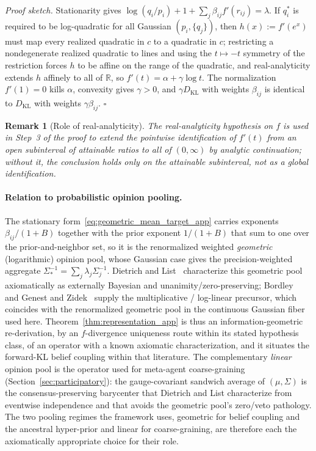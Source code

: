 \documentclass[11pt]{article}
\newtheorem{remark}{Remark}
\begin{document}
\emph{Proof sketch.} Stationarity gives $\log(q_i/p_i) + 1 + \sum_j \beta_{ij} f'(r_{ij}) = \lambda$. If $q_i^*$ is required to be log-quadratic for all Gaussian $(p_i, \{q_j\})$, then $h(x) := f'(e^x)$ must map every realized quadratic in $c$ to a quadratic in $c$; restricting a nondegenerate realized quadratic to lines and using the $t \mapsto -t$ symmetry of the restriction forces $h$ to be affine on the range of the quadratic, and real-analyticity extends $h$ affinely to all of $\mathbb{R}$, so $f'(t) = \alpha + \gamma\log t$. The normalization $f'(1) = 0$ kills $\alpha$, convexity gives $\gamma > 0$, and $\gamma D_{\mathrm{KL}}$ with weights $\beta_{ij}$ is identical to $D_{\mathrm{KL}}$ with weights $\gamma\beta_{ij}$. \hfill $\square$

\begin{remark}[Role of real-analyticity]
\label{rem:analyticity_role}
The real-analyticity hypothesis on $f$ is used in Step~3 of the proof to extend the pointwise identification of $f'(t)$ from an open subinterval of attainable ratios to all of $(0, \infty)$ by analytic continuation; without it, the conclusion holds only on the attainable subinterval, not as a global identification.
\end{remark}

\paragraph{Relation to probabilistic opinion pooling.} The stationary form~\eqref{eq:geometric_mean_target_app} carries exponents $\beta_{ij}/(1+B)$ together with the prior exponent $1/(1+B)$ that sum to one over the prior-and-neighbor set, so it is the renormalized weighted \emph{geometric} (logarithmic) opinion pool, whose Gaussian case gives the precision-weighted aggregate $\Sigma_*^{-1} = \sum_j \lambda_j \Sigma_j^{-1}$. Dietrich and List~\cite{dietrich2016probabilistic} characterize this geometric pool axiomatically as externally Bayesian and unanimity/zero-preserving; Bordley~\cite{bordley1982multiplicative} and Genest and Zidek~\cite{GenestZidek1986} supply the multiplicative / log-linear precursor, which coincides with the renormalized geometric pool in the continuous Gaussian fiber used here. Theorem~\ref{thm:representation_app} is thus an information-geometric re-derivation, by an $f$-divergence uniqueness route within its stated hypothesis class, of an operator with a known axiomatic characterization, and it situates the forward-KL belief coupling within that literature. The complementary \emph{linear} opinion pool is the operator used for meta-agent coarse-graining (Section~\ref{sec:participatory}): the gauge-covariant sandwich average of $(\mu, \Sigma)$ is the consensus-preserving barycenter that Dietrich and List characterize from eventwise independence and that avoids the geometric pool's zero/veto pathology. The two pooling regimes the framework uses, geometric for belief coupling and the ancestral hyper-prior and linear for coarse-graining, are therefore each the axiomatically appropriate choice for their role.
\end{document}
